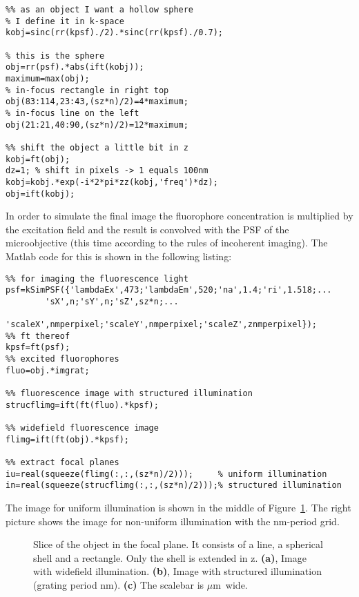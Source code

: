 \documentclass[11pt,abstracton,titlepage]{scrartcl}
\newcommand{\figref}[1]{Figure~\ref{#1}}
\begin{document}
\begin{lstlisting}
%% as an object I want a hollow sphere
% I define it in k-space
kobj=sinc(rr(kpsf)./2).*sinc(rr(kpsf)./0.7);

% this is the sphere
obj=rr(psf).*abs(ift(kobj));
maximum=max(obj);
% in-focus rectangle in right top
obj(83:114,23:43,(sz*n)/2)=4*maximum;
% in-focus line on the left
obj(21:21,40:90,(sz*n)/2)=12*maximum;

%% shift the object a little bit in z
kobj=ft(obj);
dz=1; % shift in pixels -> 1 equals 100nm
kobj=kobj.*exp(-i*2*pi*zz(kobj,'freq')*dz);
obj=ift(kobj);
\end{lstlisting}

In order to simulate the final image the fluorophore concentration is
multiplied by the excitation field and the result is convolved with
the PSF of the microobjective (this time according to the rules of
incoherent imaging). The Matlab code for this is shown in the
following listing:
\begin{lstlisting}
%% for imaging the fluorescence light
psf=kSimPSF({'lambdaEx',473;'lambdaEm',520;'na',1.4;'ri',1.518;...
        'sX',n;'sY',n;'sZ',sz*n;...
        'scaleX',nmperpixel;'scaleY',nmperpixel;'scaleZ',znmperpixel});
%% ft thereof
kpsf=ft(psf);
%% excited fluorophores
fluo=obj.*imgrat;

%% fluorescence image with structured illumination
strucflimg=ift(ft(fluo).*kpsf);

%% widefield fluorescence image
flimg=ift(ft(obj).*kpsf);

%% extract focal planes
iu=real(squeeze(flimg(:,:,(sz*n)/2)));     % uniform illumination
in=real(squeeze(strucflimg(:,:,(sz*n)/2)));% structured illumination
\end{lstlisting}


The image for uniform illumination is shown in
the middle of \figref{fig:input}. The right picture shows the image
for non-uniform illumination with the \unit[600]{nm}-period grid.

\begin{figure}[htb]
  \centering
  \caption{Slice of the object in the focal plane. It consists of a
    line, a spherical shell and a rectangle. Only the shell is
    extended in z. {\bf(a)}, Image with widefield
    illumination. {\bf(b)}, Image with structured illumination
    (grating period \unit[600]{nm}). {\bf(c)} The scalebar is
    \unit[2]{$\mu$m} wide. }
  \label{fig:input}
\end{figure}
\end{document}
